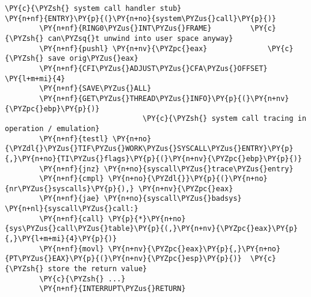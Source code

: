 \begin{Verbatim}[commandchars=\\\{\}]
\PY{c}{\PYZsh{} system call handler stub}
\PY{n+nf}{ENTRY}\PY{p}{(}\PY{n+no}{system\PYZus{}call}\PY{p}{)}
        \PY{n+nf}{RING0\PYZus{}INT\PYZus{}FRAME}         \PY{c}{\PYZsh{} can\PYZsq{}t unwind into user space anyway}
        \PY{n+nf}{pushl} \PY{n+nv}{\PYZpc{}eax}              \PY{c}{\PYZsh{} save orig\PYZus{}eax}
        \PY{n+nf}{CFI\PYZus{}ADJUST\PYZus{}CFA\PYZus{}OFFSET} \PY{l+m+mi}{4}
        \PY{n+nf}{SAVE\PYZus{}ALL}
        \PY{n+nf}{GET\PYZus{}THREAD\PYZus{}INFO}\PY{p}{(}\PY{n+nv}{\PYZpc{}ebp}\PY{p}{)}
                                \PY{c}{\PYZsh{} system call tracing in operation / emulation}
        \PY{n+nf}{testl} \PY{n+no}{\PYZdl{}\PYZus{}TIF\PYZus{}WORK\PYZus{}SYSCALL\PYZus{}ENTRY}\PY{p}{,}\PY{n+no}{TI\PYZus{}flags}\PY{p}{(}\PY{n+nv}{\PYZpc{}ebp}\PY{p}{)}
        \PY{n+nf}{jnz} \PY{n+no}{syscall\PYZus{}trace\PYZus{}entry}
        \PY{n+nf}{cmpl} \PY{n+no}{\PYZdl{}}\PY{p}{(}\PY{n+no}{nr\PYZus{}syscalls}\PY{p}{),} \PY{n+nv}{\PYZpc{}eax}
        \PY{n+nf}{jae} \PY{n+no}{syscall\PYZus{}badsys}
\PY{n+nl}{syscall\PYZus{}call:}
        \PY{n+nf}{call} \PY{p}{*}\PY{n+no}{sys\PYZus{}call\PYZus{}table}\PY{p}{(,}\PY{n+nv}{\PYZpc{}eax}\PY{p}{,}\PY{l+m+mi}{4}\PY{p}{)}
        \PY{n+nf}{movl} \PY{n+nv}{\PYZpc{}eax}\PY{p}{,}\PY{n+no}{PT\PYZus{}EAX}\PY{p}{(}\PY{n+nv}{\PYZpc{}esp}\PY{p}{)}  \PY{c}{\PYZsh{} store the return value}
        \PY{c}{\PYZsh{} ...}
        \PY{n+nf}{INTERRUPT\PYZus{}RETURN}
\end{Verbatim}

